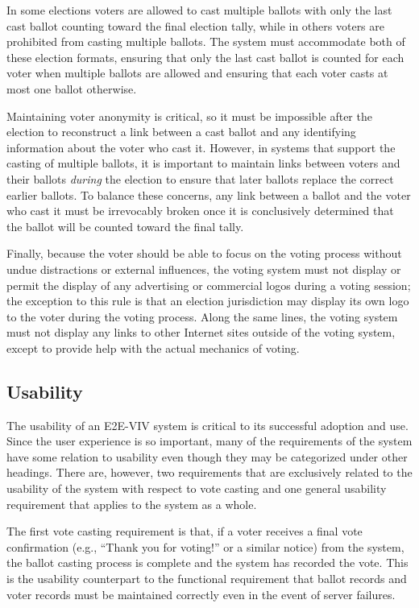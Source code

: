 In some elections voters are allowed to cast multiple ballots with
only the last cast ballot counting toward the final election tally,
while in others voters are prohibited from casting multiple
ballots. The system must accommodate both of these election formats,
ensuring that only the last cast ballot is counted for each voter when
multiple ballots are allowed and ensuring that each voter casts at
most one ballot otherwise.

Maintaining voter anonymity is critical, so it must be impossible
after the election to reconstruct a link between a cast ballot and any
identifying information about the voter who cast it. However, in
systems that support the casting of multiple ballots, it is important
to maintain links between voters and their ballots \emph{during} the
election to ensure that later ballots replace the correct earlier
ballots. To balance these concerns, any link between a ballot and the
voter who cast it must be irrevocably broken once it is conclusively
determined that the ballot will be counted toward the final tally.

Finally, because the voter should be able to focus on the voting
process without undue distractions or external influences, the voting
system must not display or permit the display of any advertising or
commercial logos during a voting session; the exception to this rule
is that an election jurisdiction may display its own logo to the voter
during the voting process. Along the same lines, the voting system
must not display any links to other Internet sites outside of the
voting system, except to provide help with the actual mechanics of
voting.

\subsection{Usability}

The usability of an E2E-VIV system is critical to its successful
adoption and use. Since the user experience is so important, many of
the requirements of the system have some relation to usability even
though they may be categorized under other headings. There are,
however, two requirements that are exclusively related to the
usability of the system with respect to vote casting and one general
usability requirement that applies to the system as a whole.

The first vote casting requirement is that, if a voter receives a
final vote confirmation (e.g., ``Thank you for voting!'' or a similar
notice) from the system, the ballot casting process is complete and
the system has recorded the vote.  This is the usability counterpart
to the functional requirement that ballot records and voter records
must be maintained correctly even in the event of server failures.

